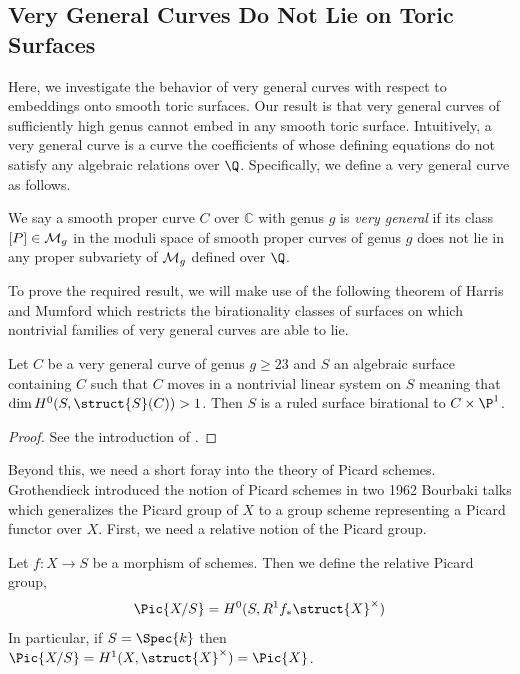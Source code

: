 \subsection{Very General Curves Do Not Lie on Toric Surfaces}


Here, we investigate the behavior of very general curves with respect to embeddings onto smooth toric surfaces. Our result is that very general curves of sufficiently high genus cannot embed in any smooth toric surface. Intuitively, a very general curve is a curve the coefficients of whose defining equations do not satisfy any algebraic relations over $\Q$. Specifically, we define a very general curve as follows.

\begin{defn}
We say a smooth proper curve $C$ over $\mathbb{C}$ with genus $g$ is \textit{very general} if its class $[P] \in \mathcal{M}_g$ in the moduli space of smooth proper curves of genus $g$ does not lie in any proper subvariety of $\mathcal{M}_g$ defined over $\Q$. 
\end{defn}

\noindent
To prove the required result, we will make use of the following theorem of Harris and Mumford which restricts the birationality classes of surfaces on which nontrivial families of very general curves are able to lie.


\begin{theorem}
Let $C$ be a very general curve of genus $g \ge 23$ and $S$ an algebraic surface containing $C$ such that $C$ moves in a nontrivial linear system on $S$ meaning that $\dim H^0(S, \struct{S}(C)) > 1$. Then $S$ is a ruled surface birational to $C \times \P^1$. 
\end{theorem}

\begin{proof}
See the introduction of \cite{Harris_Mumford}. 
\end{proof}
\noindent
Beyond this, we need a short foray into the theory of Picard schemes. Grothendieck introduced the notion of Picard schemes in two 1962 Bourbaki talks \cite{FGA} which generalizes the Picard group of $X$ to a group scheme representing a Picard functor over $X$. First, we need a relative notion of the Picard group.

\begin{defn}
Let $f : X \to S$ be a morphism of schemes. Then we define the relative Picard group,
\[ \Pic{X/S} = H^0(S, R^1 f_* \struct{X}^\times) \]
In particular, if $S = \Spec{k}$ then $\Pic{X/S} = H^1(X, \struct{X}^\times) = \Pic{X}$. 
\end{defn}

